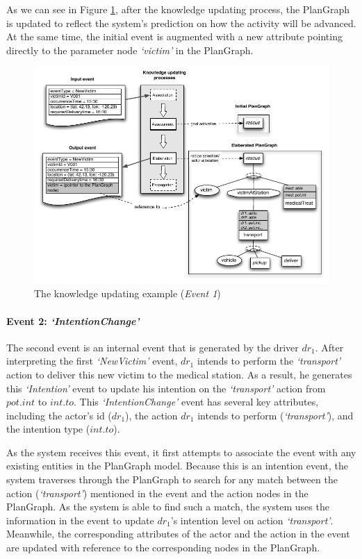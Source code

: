 As we can see in Figure \ref{fig:update_example_event1}, after the knowledge updating process, the PlanGraph is updated to reflect the system's prediction on how the activity will be advanced. At the same time, the initial event is augmented with a new attribute pointing directly to the parameter node \emph{`victim'} in the PlanGraph.
\begin{figure}[htbp] %
	\centering
	\includegraphics{update_example_event1.pdf} 
	\caption{The knowledge updating example (\emph{Event 1})}
	\label{fig:update_example_event1}
\end{figure}
\paragraph*{Event 2: \emph{`IntentionChange'}} %
\label{par:event_2_emph}
The second event is an internal event that is generated by the driver $dr_1$. After interpreting the first \emph{`NewVictim'} event, $dr_1$ intends to perform the \emph{`transport'} action to deliver this new victim to the medical station. As a result, he generates this \emph{`Intention'} event to update his intention on the \emph{`transport'} action from $pot.int$ to $int.to$. This \emph{`IntentionChange'} event has several key attributes, including the actor's id ($dr_1$), the action $dr_1$ intends to perform (\emph{`transport'}), and the intention type ($int.to$).

As the system receives this event, it first attempts to associate the event with any existing entities in the PlanGraph model. Because this is an intention event, the system traverses through the PlanGraph to search for any match between the action (\emph{`transport'}) mentioned in the event and the action nodes in the PlanGraph. As the system is able to find such a match, the system uses the information in the event to update $dr_1$'s intention level on action \emph{`transport'}. Meanwhile, the corresponding attributes of the actor and the action in the event are updated with reference to the corresponding nodes in the PlanGraph.

